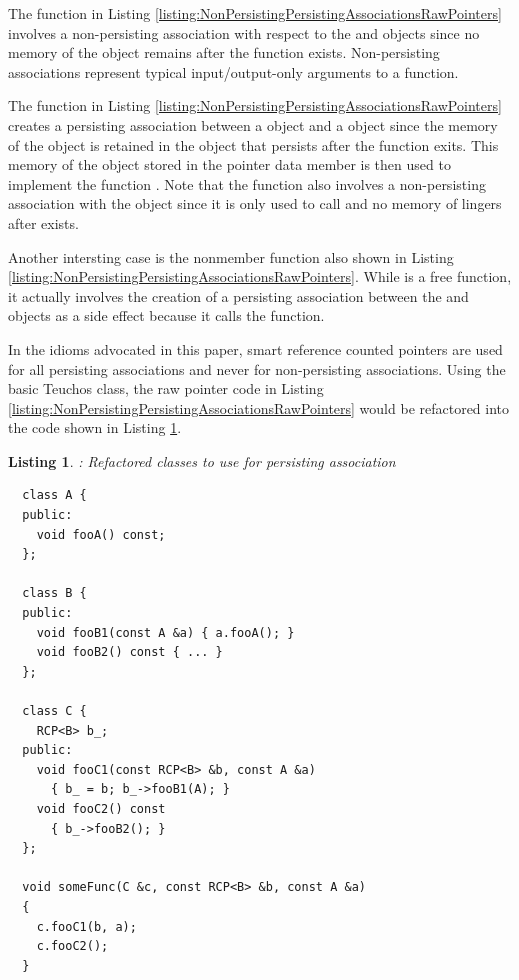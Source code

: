 \documentclass[pdf,ps2pdf,11pt]{SANDreport}
\newtheorem{listing}{Listing}
\begin{document}
The function {} in Listing
{}\ref{listing:NonPersistingPersistingAssociationsRawPointers} involves a
non-persisting association with respect to the {} and {} objects
since no memory of the object {} remains after the function
{} exists.  Non-persisting associations represent typical
input/output-only arguments to a function.

The function {} in Listing
{}\ref{listing:NonPersistingPersistingAssociationsRawPointers} creates a
persisting association between a {} object and a {} object since
the memory of the {} object is retained in the {} object that
persists after the function {} exits.  This memory of the
{} object stored in the {} pointer data member is then used
to implement the function {}.  Note that the function
{} also involves a non-persisting association with the
{} object {} since it is only used to call {} 
and no memory of {} lingers after {} exists.

Another intersting case is the nonmember function {} also
shown in Listing
{}\ref{listing:NonPersistingPersistingAssociationsRawPointers}.  While
{} is a free function, it actually involves the creation of
a persisting association between the {} and {} objects as a side
effect because it calls the {} function.

In the idioms advocated in this paper, smart reference counted pointers are
used for all persisting associations and never for non-persisting
associations.  Using the basic Teuchos {} class, the raw pointer code
in Listing {}\ref{listing:NonPersistingPersistingAssociationsRawPointers}
would be refactored into the code shown in Listing
{}\ref{listing:NonPersistingPersistingAssociationsRCP}.


{}\begin{listing}: Refactored classes to use {} for
persisting association
\label{listing:NonPersistingPersistingAssociationsRCP}
{\small\begin{verbatim}
  class A {
  public:
    void fooA() const;
  };

  class B {
  public:
    void fooB1(const A &a) { a.fooA(); }
    void fooB2() const { ... }
  };

  class C {
    RCP<B> b_;
  public:
    void fooC1(const RCP<B> &b, const A &a)
      { b_ = b; b_->fooB1(A); }
    void fooC2() const
      { b_->fooB2(); }
  };

  void someFunc(C &c, const RCP<B> &b, const A &a)
  {
    c.fooC1(b, a);
    c.fooC2();
  }
\end{verbatim}}
\end{listing}
\end{document}
